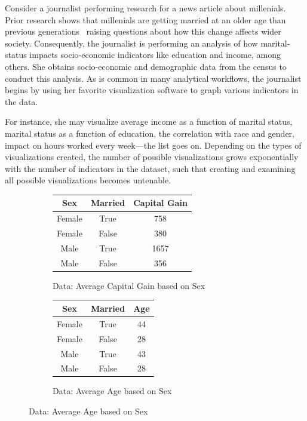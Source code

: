 \begin{example}
Consider a journalist performing research for a news article about millenials.
Prior research shows that millenials are getting married at an older age than 
previous generations~\cite{??} raising questions about how this change affects
wider society.
Consequently, the journalist is performing an analysis of how marital-status 
impacts socio-economic indicators like education and income, among others.
She obtains socio-economic and demographic data from the census\cite{} to conduct
this analysis.
As is common in many analytical workflows, the journalist begins by using her favorite 
visualization software to graph various indicators in the data.

For instance, she may visualize average income as a function of marital status,
marital status as a function of education, the correlation with race and gender,
impact on hours worked every week---the list goes on.
Depending on the types of visualizations created, the number of possible 
visualizations grows exponentially with the number of indicators in the dataset,
such that creating and examining all possible visualizations
becomes untenable.

\begin{figure}[h]
\vspace{-10pt}
	\centering
	\begin{subfigure}{0.49\linewidth}
	   \begin{tabular}{ccc} \hline
	   	Sex  &   Married & Capital Gain \\ \hline
		Female & True  &  758 \\ \hline
		Female & False &  380 \\ \hline
		Male   & True  &  1657 \\ \hline
		Male   & False &  356 \\ \hline
	  \end{tabular}
		  \caption{Data: Average Capital Gain based on Sex} \label{tab:interesting_viz}
	\end{subfigure}
	\begin{subfigure}{0.49\linewidth}
	   \begin{tabular}{ccc} \hline
	   	Sex  &   Married & Age \\ \hline
		Female & True  &  44 \\ \hline
		Female & False &  28 \\ \hline
		Male   & True  &  43 \\ \hline
		Male   & False &  28 \\ \hline
	  \end{tabular}
	  \caption{Data: Average Age based on Sex} \label{tab:uninteresting_viz}
	\end{subfigure}
	

\end{figure}
\end{example}
